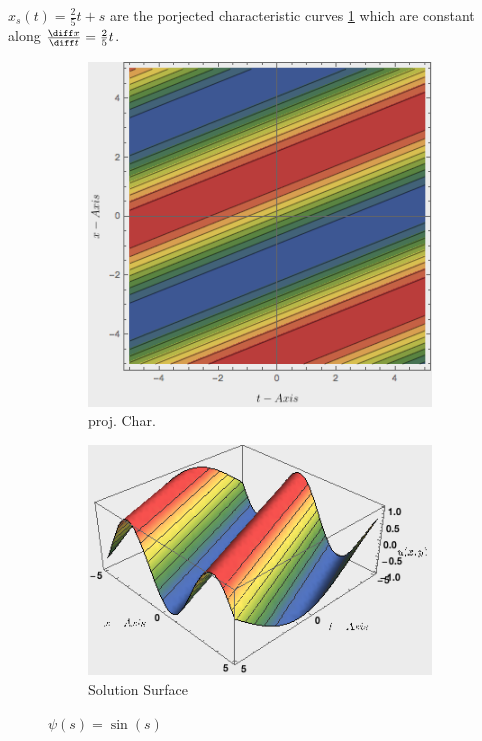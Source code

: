 \begin{notebox}[Note]
    $x_s(t)=\frac{2}{5}t+s$ are the porjected characteristic curves \cref{fig:projChar1p1} which are constant along $\frac{\diff x}{\diff t}=\frac{2}{5}t$.
                \begin{figure}[H]
                    \centering
                    \begin{subfigure}{.4\columnwidth}
                      \centering
                      \includegraphics[width=\linewidth]{figures/projChar1p1.png}
                      \caption{proj. Char.}
                      \label{fig:projChar1p1}
                    \end{subfigure}%
                    \begin{subfigure}{.6\columnwidth}
                      \centering\tabularnewline
                      \includegraphics[width=\linewidth]{figures/projChar1p2.png}
                      \caption{Solution Surface}
                      \label{fig:projChar1p2}
                    \end{subfigure}
                    \caption{$\psi(s)=\sin(s)$}
                \end{figure}
\end{notebox}

